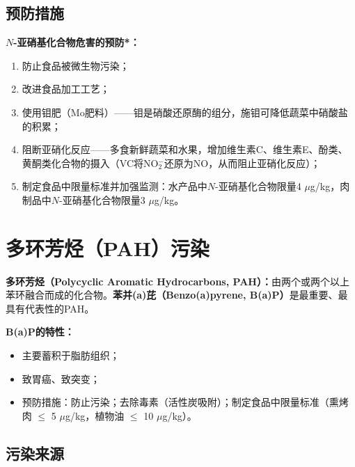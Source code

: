 \subsection{预防措施}

\begin{keybox}
\textbf{$N$-亚硝基化合物危害的预防*：}
\begin{enumerate}[leftmargin=*]
    \item 防止食品被微生物污染；
    \item 改进食品加工工艺；
    \item 使用钼肥（Mo肥料）——钼是硝酸还原酶的组分，施钼可降低蔬菜中硝酸盐的积累；
    \item 阻断亚硝化反应——多食新鲜蔬菜和水果，增加维生素C、维生素E、酚类、黄酮类化合物的摄入（VC将NO$_2^-$还原为NO，从而阻止亚硝化反应）；
    \item 制定食品中限量标准并加强监测：水产品中$N$-亚硝基化合物限量4 $\mu$g/kg，肉制品中$N$-亚硝基化合物限量3 $\mu$g/kg。%
\end{enumerate}
\end{keybox}

\section{多环芳烃（PAH）污染}

\begin{keybox}
\textbf{多环芳烃（Polycyclic Aromatic Hydrocarbons, PAH）：}由两个或两个以上苯环融合而成的化合物。\textbf{苯并(a)芘（Benzo(a)pyrene, B(a)P）}是最重要、最具有代表性的PAH。

\textbf{B(a)P的特性：}
\begin{itemize}[leftmargin=*]
    \item 主要蓄积于脂肪组织；
    \item 致胃癌、致突变；
    \item 预防措施：防止污染；去除毒素（活性炭吸附）；制定食品中限量标准（熏烤肉 $\leq$ 5 $\mu$g/kg，植物油 $\leq$ 10 $\mu$g/kg）。%
\end{itemize}
\end{keybox}

\subsection{污染来源}

